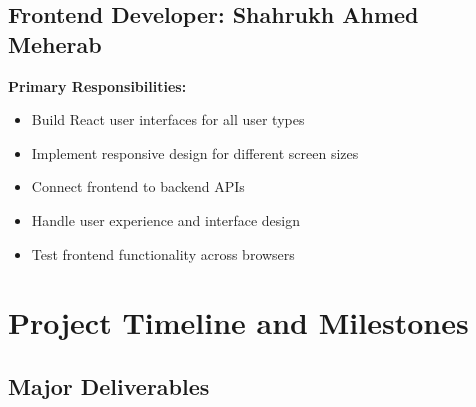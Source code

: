 \documentclass[12pt,a4paper]{article}
\newcommand{\sectionbreak}{\vspace{0.5cm}}
\begin{document}
\subsection{Frontend Developer: Shahrukh Ahmed Meherab}
\textbf{Primary Responsibilities:}
\begin{itemize}[itemsep=0.1cm]
    \item Build React user interfaces for all user types
    \item Implement responsive design for different screen sizes
    \item Connect frontend to backend APIs
    \item Handle user experience and interface design
    \item Test frontend functionality across browsers
\end{itemize}



\section{Project Timeline and Milestones}

\subsection{Major Deliverables}
\end{document}
